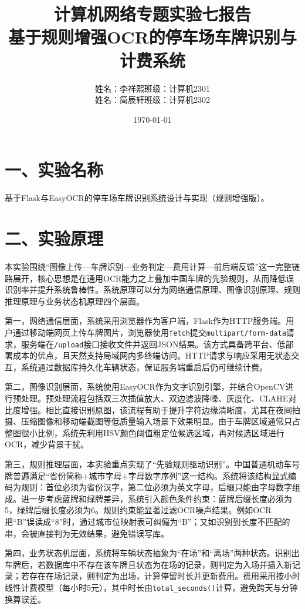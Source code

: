 \documentclass[12pt,a4paper]{article}
\title{计算机网络专题实验七报告\\\large 基于规则增强OCR的停车场车牌识别与计费系统}
\author{姓名：李祥熙\quad 班级：计算机2301 \\
姓名：简辰轩\quad 班级：计算机2302}
\date{\today}
\begin{document}
\maketitle

\section*{一、实验名称}
基于Flask与EasyOCR的停车场车牌识别系统设计与实现（规则增强版）。

\section*{二、实验原理}
本实验围绕“图像上传—车牌识别—业务判定—费用计算—前后端反馈”这一完整链路展开，核心思想是在通用OCR能力之上叠加中国车牌的先验规则，从而降低误识别率并提升系统鲁棒性。系统原理可以分为网络通信原理、图像识别原理、规则推理原理与业务状态机原理四个层面。

第一，网络通信层面，系统采用浏览器作为客户端，Flask作为HTTP服务端。用户通过移动端网页上传车牌图片，浏览器使用\texttt{fetch}提交\texttt{multipart/form-data}请求，服务端在\texttt{/upload}接口接收文件并返回JSON结果。该方式具备跨平台、低部署成本的优点，且天然支持局域网内多终端访问。HTTP请求与响应采用无状态交互，系统通过数据库持久化车辆状态，保证服务端重启后仍可继续计费。

第二，图像识别层面，系统使用EasyOCR作为文字识别引擎，并结合OpenCV进行预处理。预处理流程包括双三次插值放大、双边滤波降噪、灰度化、CLAHE对比度增强。相比直接识别原图，该流程有助于提升字符边缘清晰度，尤其在夜间拍摄、压缩图像和移动端截图等低质量输入场景下效果明显。由于车牌区域通常只占整图很小比例，系统先利用HSV颜色阈值粗定位候选区域，再对候选区域进行OCR，减少背景干扰。

第三，规则推理层面，本实验重点实现了“先验规则驱动识别”。中国普通机动车号牌普遍满足“省份简称+城市字母+字母数字序列”这一结构。系统将该结构显式编码为规则：首位必须为省份汉字，第二位必须为英文字母，后缀只能由字母数字组成。进一步考虑蓝牌和绿牌差异，系统引入颜色条件约束：蓝牌后缀长度必须为5，绿牌后缀长度必须为6。规则约束能显著过滤OCR噪声结果。例如OCR把“B”误读成“8”时，通过城市位映射表可纠偏为“B”；又如识别到长度不匹配的串，会被直接判为无效结果，避免错误写库。

第四，业务状态机层面，系统将车辆状态抽象为“在场”和“离场”两种状态。识别出车牌后，若数据库中不存在该车牌且状态为在场的记录，则判定为入场并插入新记录；若存在在场记录，则判定为出场，计算停留时长并更新费用。费用采用按小时线性计费模型（每小时5元），其中时长由\texttt{total\_seconds()}计算，避免跨天与分钟换算误差。
\end{document}
